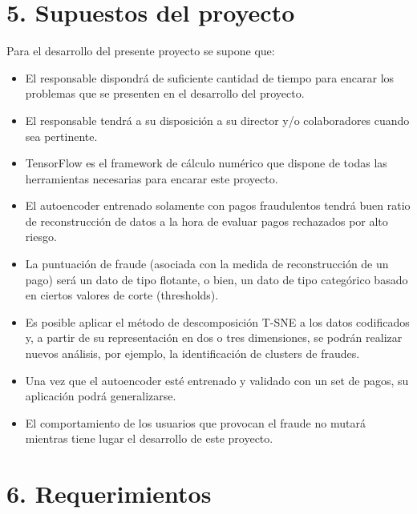 \documentclass[
11pt, %
]{charter}
\begin{document}
\section{5. Supuestos del proyecto}
\label{sec:supuestos}
Para el desarrollo del presente proyecto se supone que:
\begin{itemize}
	\item El responsable dispondrá de suficiente cantidad de tiempo para encarar los problemas que se presenten en el desarrollo del proyecto.
	\item El responsable tendrá a su disposición a su director y/o colaboradores cuando sea pertinente.
	\item TensorFlow es el framework de cálculo numérico que dispone de todas las herramientas necesarias para encarar este proyecto.
	\item El autoencoder entrenado solamente con pagos fraudulentos tendrá buen ratio de reconstrucción de datos a la hora de evaluar pagos rechazados por alto riesgo.
	\item La puntuación de fraude (asociada con la medida de reconstrucción de un pago) será un dato de tipo flotante, o bien, un dato de tipo categórico basado en ciertos valores de corte (thresholds). 
	\item Es posible aplicar el método de descomposición T-SNE a los datos codificados y, a partir de su representación en dos o tres dimensiones, se podrán realizar nuevos análisis, por ejemplo, la identificación de clusters de fraudes.
	\item Una vez que el autoencoder esté entrenado y validado con un set de pagos, su aplicación podrá generalizarse.
	\item El comportamiento de los usuarios que provocan el fraude no mutará mientras tiene lugar el desarrollo de este proyecto.
\end{itemize}

\section{6. Requerimientos}
\label{sec:requerimientos}
\end{document}
